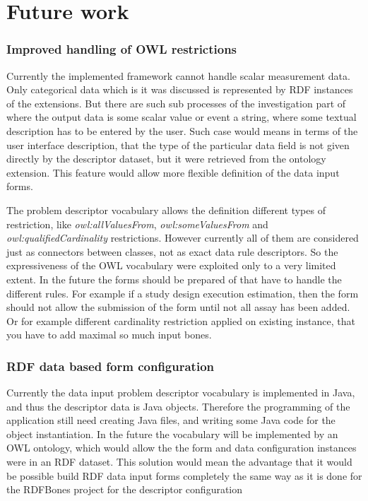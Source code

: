 \section{Future work}

\subsubsection{Improved handling of OWL restrictions}

Currently the implemented framework cannot handle scalar measurement data. Only categorical data which is it was discussed is represented by RDF instances of the extensions. But there are such sub processes of the investigation part of where the output data is some scalar value or event a string, where some textual description has to be entered by the user. Such case would means in terms of the user interface description, that the type of the particular data field is not given directly by the descriptor dataset, but it were retrieved from the ontology extension. This feature would allow more flexible definition of the data input forms.


The problem descriptor vocabulary allows the definition different types of restriction, like \textit{owl:allValuesFrom}, \textit{owl:someValuesFrom} and \textit{owl:qualifiedCardinality} restrictions. However currently all of them are considered just as connectors between classes, not as exact data rule descriptors. So the expressiveness of the OWL vocabulary were exploited only to a very limited extent. In the future the forms should be prepared of that have to handle the different rules. For example if a study design execution estimation, then the form should not allow the submission of the form until not all assay has been added. Or for example different cardinality restriction applied on existing instance, that you have to add maximal so much input bones. 


\subsubsection{RDF data based form configuration}


Currently the data input problem descriptor vocabulary is implemented in Java, and thus the descriptor data is Java objects. Therefore the programming of the application still need creating Java files, and writing some Java code for the object instantiation. In the future the vocabulary will be implemented by an OWL ontology, which would allow the the form and data configuration instances were in an RDF dataset. This solution would mean the advantage that it would be possible build RDF data input forms completely the same way as it is done for the RDFBones project  for the descriptor configuration








